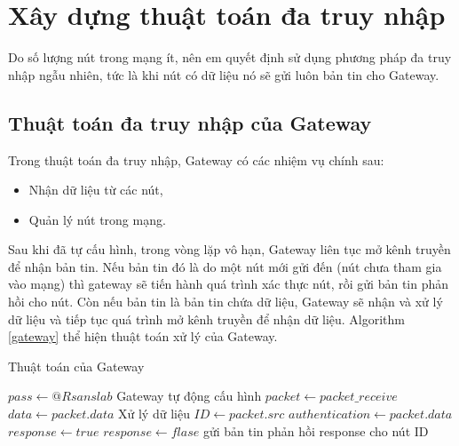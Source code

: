\section{Xây dựng thuật toán đa truy nhập}
Do số lượng nút trong mạng ít, nên em quyết định sử dụng phương pháp đa truy nhập ngẫu nhiên, tức là khi nút có dữ liệu nó sẽ gửi luôn bản tin cho Gateway.
\subsection{Thuật toán đa truy nhập của Gateway}
Trong thuật toán đa truy nhập, Gateway có các nhiệm vụ chính sau:
 \begin{itemize}
 \item	Nhận dữ liệu từ các nút,
 \item	Quản lý nút trong mạng.
 \end{itemize}
 \par 
Sau khi đã tự cấu hình, trong vòng lặp vô hạn, Gateway liên tục mở kênh truyền để nhận bản tin. Nếu bản tin đó là do một nút mới gửi đến (nút chưa tham gia vào mạng) thì gateway sẽ tiến hành quá trình xác thực nút, rồi gửi bản tin phản hồi cho nút. Còn nếu bản tin là bản tin chứa dữ liệu, Gateway sẽ nhận và xử lý dữ liệu và tiếp tục quá trình mở kênh truyền để nhận dữ liệu. Algorithm \ref{gateway} thể hiện thuật toán xử lý của Gateway.
\begin{center}
\begin{algorithm}[h]
	\caption{Thuật toán của Gateway}
	\label{gateway}
	\begin{algorithmic}[1]
		\State $pass \gets @Rsanslab$
		\State Gateway tự động cấu hình  
				\State $packet \gets packet\_receive$	
					\State $data \gets packet.data$
					\State Xử lý dữ liệu	
					\State	$ID \gets packet.src$	
					\State	$authentication \gets packet.data$ 
					\State 	$response \gets true$
						\State $response \gets flase$
					\EndIf
					\State gửi bản tin phản hồi response cho nút ID
				\EndIf
			\EndIf		
		\EndWhile
	\end{algorithmic}
\end{algorithm}
\end{center}
